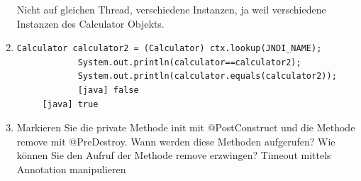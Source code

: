\documentclass[a4paper,10pt]{scrreprt}
\begin{document}
\begin{enumerate}
\begin{lstlisting}[language={}]
\end{lstlisting}
{\color{red} Nicht auf gleichen Thread, verschiedene Instanzen, ja weil verschiedene Instanzen des Calculator Objekts.}
\item \begin{lstlisting}[language={}]
Calculator calculator2 = (Calculator) ctx.lookup(JNDI_NAME);
			System.out.println(calculator==calculator2);
			System.out.println(calculator.equals(calculator2));
            [java] false
     [java] true
      \end{lstlisting}
      
\item Markieren Sie die private Methode init mit @PostConstruct und die Methode remove mit
@PreDestroy. Wann werden diese Methoden aufgerufen? Wie können Sie den Aufruf der Methode
remove erzwingen? {\color{red} Timeout mittels Annotation manipulieren} 
\end{enumerate}
\end{document}
